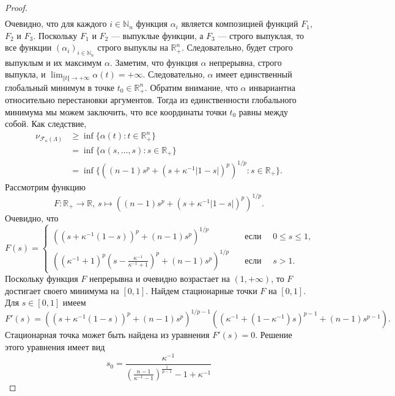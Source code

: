 \documentclass[12pt]{article}
\begin{document}
\begin{proof}
\[\begin{aligned}
    \end{aligned}
    \]
    Очевидно, что для каждого $i\in\mathbb{N}_n$ функция $\alpha_i$ является 
    композицией функций $F_1$, $F_2$ и $F_3$. Поскольку $F_1$ 
    и $F_2$ --- выпуклые функции, а $F_3$ --- строго выпуклая, то все 
    функции $(\alpha_i)_{i\in\mathbb{N}_n}$ строго выпуклы 
    на $\mathbb{R}_+^n$. Следовательно, будет строго выпуклым и их 
    максимум $\alpha$. Заметим, что функция $\alpha$ непрерывна, строго выпукла, 
    и $\lim_{\Vert t\Vert\to+\infty}\alpha(t)=+\infty$. Следовательно, $\alpha$ 
    имеет единственный глобальный минимум в точке $t_0\in\mathbb{R}_+^n$. Обратим 
    внимание, что $\alpha$ инвариантна относительно перестановки аргументов. 
    Тогда из единственности глобального минимума мы можем заключить, что все 
    координаты точки $t_0$ равны между собой. Как следствие,
    \[
    \begin{aligned}
        \nu_{\mathcal{F}_{\kappa}(\Lambda)}
        &\geq\inf\{\alpha(t) : t\in\mathbb{R}_+^n\} \\
        &=\inf\{\alpha(s,\ldots,s) : s\in\mathbb{R}_+\} \\
        &=\inf\{((n-1)s^p+(s+\kappa^{-1}|1-s|)^p)^{1/p} : s\in\mathbb{R}_+\}.
    \end{aligned}
    \]
    Рассмотрим функцию
    \[
        F:\mathbb{R}_+\to\mathbb{R},\,
        s\mapsto ((n-1)s^p+(s+\kappa^{-1}|1-s|)^p)^{1/p}.
    \]
    Очевидно, что
    \[
        F(s)=
        \begin{cases}
            ((s+\kappa^{-1}(1-s))^p+(n-1)s^p)^{1/p}
            \quad&\text{если }\quad 0\leq s\leq 1, \\
            \left(
                (\kappa^{-1}+1)^p
                \left(s-\frac{\kappa^{-1}}{\kappa^{-1}+1}\right)^p+
                (n-1)s^p
            \right)^{1/p}
            \quad&\text{если }\quad s>1.
        \end{cases}
    \]
    Поскольку функция $F$ непрерывна и очевидно возрастает на $(1,+\infty)$, 
    то $F$ достигает своего минимума на $[0, 1]$. Найдем стационарные точки 
    $F$ на $[0, 1]$. Для $s\in[0,1]$ имеем
    \[
        F'(s)=
        ((s+\kappa^{-1}(1-s))^p+(n-1)s^p)^{1/p-1}
        ((\kappa^{-1}+(1-\kappa^{-1})s)^{p-1}+(n-1)s^{p-1}).
    \]
    Стационарная точка может быть найдена из уравнения $F'(s)=0$. 
    Решение этого уравнения имеет вид
    \[
        s_0
        =\frac{
            \kappa^{-1}
        }{
            \left(
                \frac{n-1}{\kappa^{-1}-1}
            \right)^{\frac{1}{p-1}}
            -1+\kappa^{-1}
}\]
\end{proof}
\end{document}
